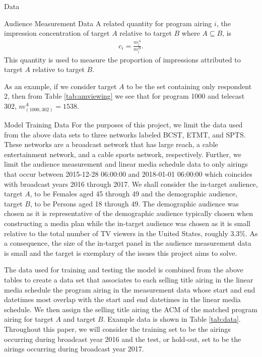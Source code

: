\begin{chapter}{Data}
\begin{section}{Audience Measurement Data}
  A related quantity for program airing $i$, the impression concentration of target $A$ relative to target $B$ where $A \subseteq B$, is
  \begin{align*}
    c_i = \frac{m_{i}^A}{m_{i}^B}.
  \end{align*}
  This quantity is used to measure the proportion of impressions attributed to target $A$ relative to target $B$.

  As an example, if we consider target $A$ to be the set containing only respondent 2, then
  from Table \ref{tab:amviewing} we see that for program 1000 and telecast 302, $m_{(1000, 302)}^A = 1538$.
\end{section}

\begin{section}{Model Training Data}\label{data:used}
  For the purposes of this project, we limit the data used from the above data sets
  to three networks labeled BCST, ETMT, and SPTS. These networks are a broadcast network
  that has large reach, a cable entertainment network, and a cable sports network, respectively.
  Further, we limit the audience measurement and linear media schedule data to only airings that occur
  between 2015-12-28 06:00:00 and 2018-01-01 06:00:00 which coincides with broadcast years 2016 through 2017.
  We shall consider the in-target audience, target $A$, to be Females aged 45 through 49 and the demographic audience, target $B$,
  to be Persons aged 18 through 49. The demographic audience was chosen as it is representative
  of the demographic audience typically chosen when constructing a media plan while the in-target
  audience was chosen as it is small relative to the total number of TV viewers in the United States, roughly 3.3\%.
  As a consequence, the size of the in-target panel in the audience measurement data is small and the target is
  exemplary of the issues this project aims to solve.

  The data used for training and testing the model is combined from the above tables to create a
  data set that associates to each selling title airing in the linear media schedule the program airing in the measurement data whose start and end datetimes
  most overlap with the start and end datetimes in the linear media schedule. We then assign
  the selling title airing the ACM of the matched program airing for target $A$ and target $B$.
  Example data is shown in Table \ref{tab:data}. Throughout this paper, we will consider the training set
  to be the airings occurring during broadcast year 2016 and the test, or hold-out, set to
  be the airings occurring during broadcast year 2017.


\end{section}
\end{chapter}
